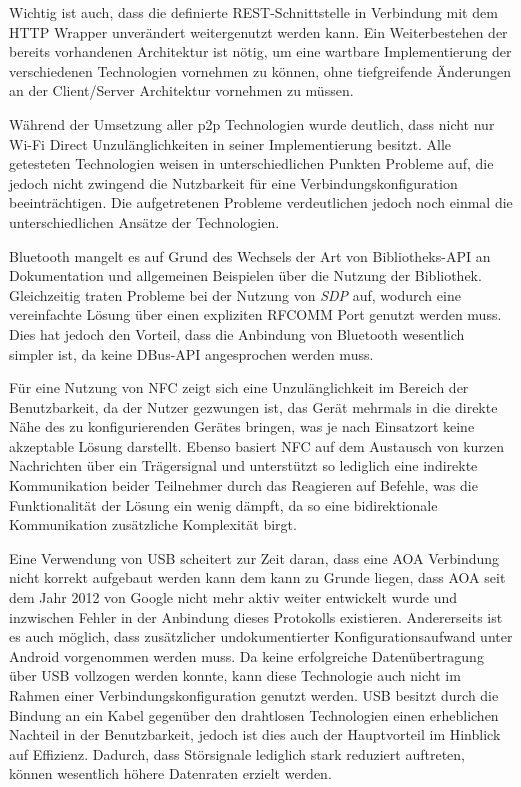 Wichtig ist auch, dass die definierte REST-Schnittstelle in Verbindung mit dem HTTP Wrapper unverändert weitergenutzt werden kann. Ein Weiterbestehen der bereits vorhandenen Architektur ist nötig, um eine wartbare Implementierung der verschiedenen Technologien vornehmen zu können, ohne tiefgreifende Änderungen an der Client/Server Architektur vornehmen zu müssen. 

Während der Umsetzung aller p2p Technologien wurde deutlich, dass nicht nur Wi-Fi Direct Unzulänglichkeiten in seiner Implementierung besitzt. Alle getesteten Technologien weisen in unterschiedlichen Punkten Probleme auf, die jedoch nicht zwingend die Nutzbarkeit für eine Verbindungskonfiguration beeinträchtigen. Die aufgetretenen Probleme verdeutlichen jedoch noch einmal die unterschiedlichen \linebreak Ansätze der Technologien.

Bluetooth mangelt es auf Grund des Wechsels der Art von Bibliotheks-API an Dokumentation und allgemeinen Beispielen über die Nutzung der Bibliothek. Gleichzeitig traten Probleme bei der Nutzung von {\it SDP} auf, wodurch eine vereinfachte Lösung über einen expliziten RFCOMM Port genutzt werden muss. Dies hat jedoch den Vorteil, dass die Anbindung von Bluetooth wesentlich simpler ist, da keine DBus-API angesprochen werden muss.

Für eine Nutzung von NFC zeigt sich eine Unzulänglichkeit im Bereich der Benutzbarkeit, da der Nutzer gezwungen ist, das Gerät mehrmals in die direkte Nähe des zu konfigurierenden Gerätes bringen, was je nach Einsatzort keine akzeptable Lösung darstellt. Ebenso basiert NFC auf dem Austausch von kurzen Nachrichten über ein Trägersignal und unterstützt so lediglich eine indirekte Kommunikation  beider Teilnehmer durch das Reagieren auf Befehle, was die Funktionalität der Lösung ein wenig dämpft, da so eine bidirektionale Kommunikation zusätzliche Komplexität birgt.

Eine Verwendung von USB scheitert zur Zeit daran, dass eine AOA Verbindung nicht korrekt aufgebaut werden kann dem kann zu Grunde liegen, dass AOA seit dem Jahr 2012 von Google nicht mehr aktiv weiter entwickelt wurde und inzwischen Fehler in der Anbindung dieses Protokolls existieren. Andererseits ist es auch möglich, dass zusätzlicher undokumentierter Konfigurationsaufwand unter Android vorgenommen werden muss. Da keine erfolgreiche Datenübertragung über USB vollzogen werden konnte, kann diese Technologie auch nicht im Rahmen einer Verbindungskonfiguration genutzt werden. USB besitzt durch die Bindung an ein Kabel gegenüber den drahtlosen Technologien einen erheblichen Nachteil in der Benutzbarkeit, jedoch ist dies auch der Hauptvorteil im Hinblick auf Effizienz. Dadurch, dass Störsignale lediglich stark reduziert auftreten, können wesentlich höhere Datenraten erzielt werden.

